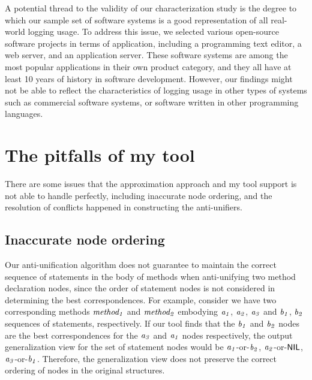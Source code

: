 A potential thread to the validity of our characterization study is the degree to which our sample set of software systems is a good representation of all real-world logging usage. To address this issue, we selected various open-source software projects in terms of application, including a programming text editor, a web server, and an application server. These software systems are among the most popular applications in their own product category, and they all have at least 10 years of history in software development. However, our findings might not be able to reflect the characteristics of logging usage in other types of systems such as commercial software systems, or software written in other programming languages. 

\section{The pitfalls of my tool}  \label{limitations}
There are some issues that the approximation approach and my tool support is not able to handle perfectly, including inaccurate node ordering, and the resolution of conflicts happened in constructing the anti-unifiers.

\subsection{Inaccurate node ordering}  \label{mismatch} 
Our anti-unification algorithm does not guarantee to maintain the correct sequence of statements in the body of methods when anti-unifying two method declaration nodes, since the order of statement nodes is not considered in determining the best correspondences. For example, consider we have two corresponding methods $\mathit{method_1}$ and $\mathit{method_2}$ embodying {$\mathit{a_1}$, $\mathit{a_2}$, $\mathit{a_3}$} and {$\mathit{b_1}$, $\mathit{b_2}$} sequences of statements, respectively. If our tool finds that the $\mathit{b_1}$ and $\mathit{b_2}$ nodes are the best correspondences for the $\mathit{a_3}$ and $\mathit{a_1}$ nodes respectively, the output generalization view for the set of statement nodes would be {$\mathit{a_1}$-or-$\mathit{b_2}$, $\mathit{a_2}$-or-$\textsf{NIL}$, $\mathit{a_3}$-or-$\mathit{b_1}$}. Therefore, the generalization view does not preserve the correct ordering of nodes in the original structures.


